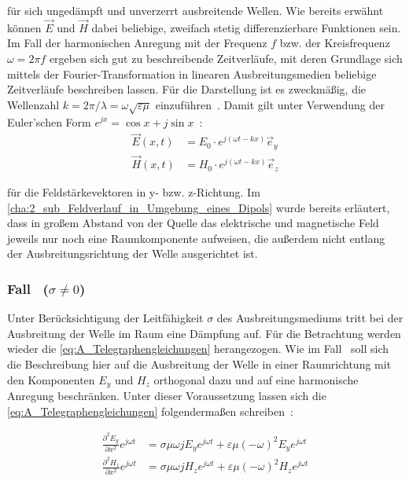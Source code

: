 für sich ungedämpft und unverzerrt ausbreitende Wellen. Wie bereits erwähnt können $\vec E$ und $\vec H$ dabei beliebige, zweifach stetig differenzierbare Funktionen sein. Im Fall der harmonischen Anregung mit der Frequenz $f$ bzw. der Kreisfrequenz $\omega = 2\pi f$ ergeben sich gut zu beschreibende Zeitverläufe, mit deren Grundlage sich mittels der Fourier-Transformation in linearen Ausbreitungsmedien beliebige Zeitverläufe beschreiben lassen. 
\newpage
Für die Darstellung ist es zweckmäßig, die Wellenzahl $k = 2\pi / \lambda = \omega \sqrt{\varepsilon \mu}$ einzuführen~\cite{EM_Schirmung}. Damit gilt unter Verwendung der Euler'schen Form $e^{jx} = \cos{x} + j \sin{x}$~\cite{Merzinger}:
\begin{subequations}
    \begin{align}
        \vec E(x,t) &= E_0 \cdot e^{j (\omega t - k x)} \vec e_y \\
        \vec H(x,t) &= H_0 \cdot e^{j (\omega t - k x)} \vec e_z
    \end{align}
    \label{eq:A_Wellengleichungen}
\end{subequations}

für die Feldstärkevektoren in y- bzw. z-Richtung. Im \Abschnitt \ref{cha:2_sub_Feldverlauf_in_Umgebung_eines_Dipols} wurde bereits erläutert, dass in großem Abstand von der Quelle das elektrische und magnetische Feld jeweils nur noch eine Raumkomponente aufweisen, die außerdem nicht entlang der Ausbreitungsrichtung der Welle ausgerichtet ist.


\subsubsection{Fall~ ($\sigma \neq 0$)}

Unter Berücksichtigung der Leitfähigkeit $\sigma$ des Ausbreitungsmediums tritt bei der Ausbreitung der Welle im Raum eine Dämpfung auf. Für die Betrachtung werden wieder die \Gleichungen \eqref{eq:A_Telegraphengleichungen} herangezogen. Wie im Fall~ soll sich die Beschreibung hier auf die Ausbreitung der Welle in einer Raumrichtung mit den Komponenten $E_y$ und $H_z$ orthogonal dazu und auf eine harmonische Anregung beschränken. Unter dieser Voraussetzung lassen sich die \Gleichungen \eqref{eq:A_Telegraphengleichungen} folgendermaßen schreiben~\cite{EM_Schirmung}:

\begin{subequations}
    \begin{align}
        \frac{\partial^2 E_y}{\partial x^2} e^{j\omega t} &= \sigma \mu \omega j E_y e^{j \omega t} + \varepsilon \mu (- \omega)^2 E_y e^{j \omega t} \\
        \frac{\partial^2 H_z}{\partial x^2} e^{j\omega t} &= \sigma \mu \omega j H_z e^{j \omega t} + \varepsilon \mu (- \omega)^2 H_z e^{j \omega t}
    \end{align}
\end{subequations}

